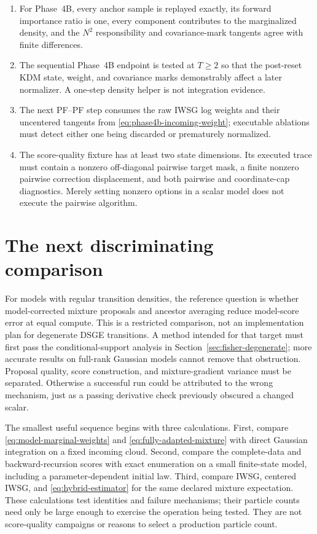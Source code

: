 \documentclass[11pt]{article}
\begin{document}
\begin{enumerate}[leftmargin=2em]
        denominator, support, and forward Jacobian must all be present.
  \item For Phase~4B, every anchor sample is replayed exactly, its forward
        importance ratio is one, every component contributes to the
        marginalized density, and the $N^2$ responsibility and covariance-mark
        tangents agree with finite differences.
  \item The sequential Phase~4B endpoint is tested at $T\ge2$ so that the
        post-reset KDM state, weight, and covariance marks demonstrably affect
        a later normalizer.  A one-step density helper is not integration
        evidence.
  \item The next PF--PF step consumes the raw IWSG log weights and their
        uncentered tangents from \eqref{eq:phase4b-incoming-weight}; executable
        ablations must detect either one being discarded or prematurely
        normalized.
  \item The score-quality fixture has at least two state dimensions.  Its
        executed trace must contain a nonzero off-diagonal pairwise target mask,
        a finite nonzero pairwise correction displacement, and both pairwise and
        coordinate-cap diagnostics.  Merely setting nonzero options in a scalar
        model does not execute the pairwise algorithm.
\end{enumerate}

\section{The next discriminating comparison}
\label{sec:next-study}

For models with regular transition densities, the reference question is
whether model-corrected mixture proposals and ancestor averaging reduce
model-score error at equal compute. This is a restricted comparison, not an
implementation plan for degenerate DSGE transitions. A method intended for
that target must first pass the conditional-support analysis in
Section~\ref{sec:fisher-degenerate}; more accurate results on full-rank
Gaussian models cannot remove that obstruction. Proposal
quality, score construction, and mixture-gradient variance must be separated.
Otherwise a successful run could be attributed to the wrong mechanism, just
as a passing derivative check previously obscured a changed scalar.

The smallest useful sequence begins with three calculations. First, compare
\eqref{eq:model-marginal-weights} and
\eqref{eq:fully-adapted-mixture} with direct Gaussian integration on a fixed
incoming cloud. Second, compare the complete-data and backward-recursion
scores with exact enumeration on a small finite-state model, including a
parameter-dependent initial law. Third, compare IWSG, centered IWSG, and
\eqref{eq:hybrid-estimator} for the same declared mixture expectation.
These calculations test identities and failure mechanisms; their particle
counts need only be large enough to exercise the operation being tested.
They are not score-quality campaigns or reasons to select a production
particle count.
\end{document}
